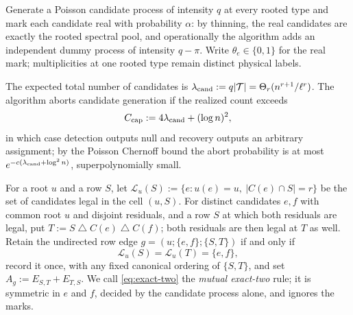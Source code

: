 \documentclass[11pt]{article}
\theoremstyle{definition}
\theoremstyle{remark}
\newcommand{\1}{\mathbf 1}
\newcommand{\cL}{\mathcal L}
\newcommand{\cT}{\mathcal T}
\newcommand{\sd}{\mathbin{\triangle}}
\numberwithin{equation}{section}
\begin{document}
Generate a Poisson candidate process of intensity $q$ at every rooted
type and mark each candidate real with probability $\alpha$: by
thinning, the real candidates are exactly the rooted spectral pool, and
operationally the algorithm adds an independent dummy process of
intensity $q-\pi$.  Write $\theta_e\in\{0,1\}$ for the real mark;
multiplicities at one rooted type remain distinct physical labels.

The expected total number of candidates is
$\lambda_{\rm cand}:=q|\cT|=\Theta_r(n^{r+1}/\ell^r)$.  The algorithm
aborts candidate generation if the realized count exceeds
\begin{equation}\label{eq:candidate-cap}
 C_{\rm cap}:=4\lambda_{\rm cand}+(\log n)^2,
\end{equation}
in which case detection outputs \textsf{null} and recovery outputs an
arbitrary assignment; by the Poisson Chernoff bound the abort
probability is at most $e^{-c(\lambda_{\rm cand}+\log^2n)}$,
superpolynomially small.

For a root $u$ and a row $S$, let
$\cL_u(S):=\{e:u(e)=u,\ |C(e)\cap S|=r\}$
be the set of candidates legal in the cell $(u,S)$.  For distinct
candidates $e,f$ with common root $u$ and disjoint residuals, and a row
$S$ at which both residuals are legal, put $T:=S\sd C(e)\sd C(f)$; both
residuals are then legal at $T$ as well.  Retain the undirected row edge
$g=(u;\{e,f\};\{S,T\})$ if and only if
\begin{equation}\label{eq:exact-two}
 \cL_u(S)=\cL_u(T)=\{e,f\},
\end{equation}
record it once, with any fixed canonical ordering of $\{S,T\}$, and set
$A_g:=E_{S,T}+E_{T,S}$.  We call \cref{eq:exact-two} the \emph{mutual
exact-two} rule; it is symmetric in $e$ and $f$, decided by the
candidate process alone, and ignores the marks.
\end{document}

